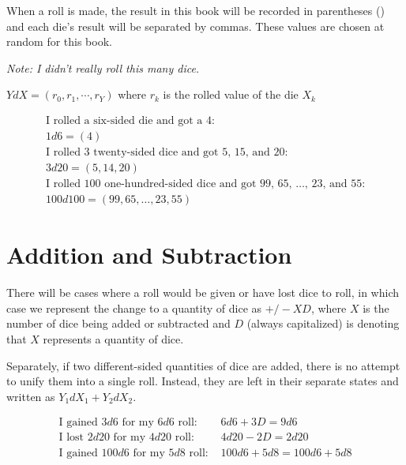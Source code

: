 \documentclass[../main.tex]{subfiles}
\begin{document}
    When a roll is made, the result in this book will be recorded in parentheses () and each die's result will be separated by commas. These values are chosen at random for this book.
    
    \emph{Note: I didn't really roll this many dice.}
    \begin{mdframed}[style=Arrata]
        \begin{center}
            $YdX = (r_{0},r_{1},\cdots,r_{Y})$ where $r_{k}$ is the rolled value of the die $X_{k}$
        \end{center}
        \begin{equation*}
            \begin{gathered}
            \text{I rolled a six-sided die and got a 4:}                                    \\
                    1d6  = (4)                                                              \\
            \text{I rolled 3 twenty-sided dice and got 5, 15, and 20:}                      \\
                    3d20 = (5, 14, 20)                                                      \\
            \text{I rolled 100 one-hundred-sided dice and got 99, 65, \ldots, 23, and 55:}\\
                    100d100 = (99, 65, \ldots, 23, 55)                                      
            \end{gathered}
        \end{equation*}
    \end{mdframed}

    \section{Addition and Subtraction}

    There will be cases where a roll would be given or have lost dice to roll, in which case we represent the change to a quantity of dice as $+/-XD$, where $X$ is the number of dice being added or subtracted and $D$ (always capitalized) is denoting that $X$ represents a quantity of dice.

    Separately, if two different-sided quantities of dice are added, there is no attempt to unify them into a single roll. Instead, they are left in their separate states and written as $Y_{1}dX_{1} + Y_{2}dX_{2}$.
    \\
    \begin{mdframed}[style=Arrata]
        \begin{align*}
            \text{I gained $3d6$ for my $6d6$ roll: } & 6d6 + 3D = 9d6          \\
            \text{I lost $2d20$ for my $4d20$ roll: } & 4d20 - 2D = 2d20        \\
            \text{I gained $100d6$ for my $5d8$ roll: } & 100d6 + 5d8 = 100d6 + 5d8    
        \end{align*}
    \end{mdframed}
\end{document}

